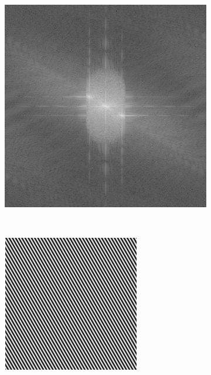\begin{figure}[ht!]
\begin{subfigure}[t]{0.23\textwidth}
        \caption{}
    \end{subfigure}\hfill
    \begin{subfigure}[t]{0.23\textwidth}
        \centering
        \includegraphics[width=\textwidth]{sim_slit/2/fft}
        \caption{}
    \end{subfigure}\\\vspace{\abovecaptionskip}
    \begin{subfigure}[t]{0.23\textwidth}
        \centering
        \includegraphics[width=\textwidth]{sim_slit/3/vert_pattern}

\end{subfigure}
\end{figure}
